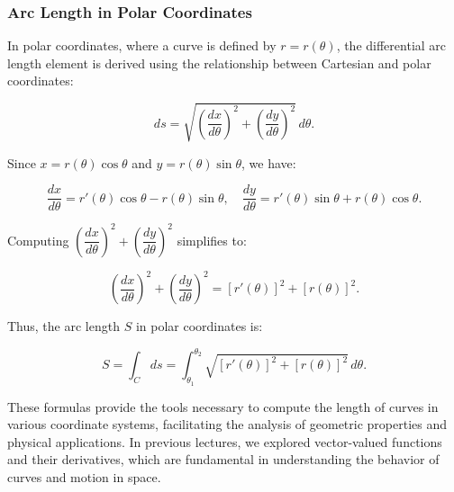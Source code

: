 \subsubsection*{Arc Length in Polar Coordinates} 

\noindent In polar coordinates, where a curve is defined by \( r = r(\theta) \), the differential arc length element is derived using the relationship between Cartesian and polar coordinates:

\[
ds = \sqrt{ \left( \frac{dx}{d\theta} \right)^2 + \left( \frac{dy}{d\theta} \right)^2 } \, d\theta.
\]

\noindent Since \( x = r(\theta) \cos \theta \) and \( y = r(\theta) \sin \theta \), we have:

\[
\frac{dx}{d\theta} = r'(\theta) \cos \theta - r(\theta) \sin \theta, \quad \frac{dy}{d\theta} = r'(\theta) \sin \theta + r(\theta) \cos \theta.
\]

\noindent Computing \( \left( \dfrac{dx}{d\theta} \right)^2 + \left( \dfrac{dy}{d\theta} \right)^2 \) simplifies to:

\[
\left( \frac{dx}{d\theta} \right)^2 + \left( \frac{dy}{d\theta} \right)^2 = [r'(\theta)]^2 + [r(\theta)]^2.
\]

\noindent Thus, the arc length \( S \) in polar coordinates is:

\[
S = \int_{C} ds = \int_{\theta_1}^{\theta_2} \sqrt{ [r'(\theta)]^2 + [r(\theta)]^2 } \, d\theta.
\]

\noindent These formulas provide the tools necessary to compute the length of curves in various coordinate systems, facilitating the analysis of geometric properties and physical applications. In previous lectures, we explored vector-valued functions and their derivatives, which are fundamental in understanding the behavior of curves and motion in space.


